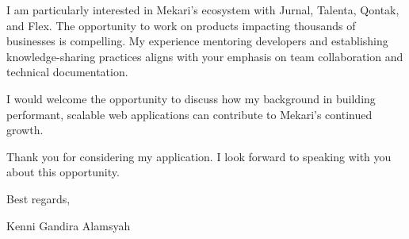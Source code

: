 \documentclass[11pt]{article}
\begin{document}
I am particularly interested in Mekari's ecosystem with Jurnal, Talenta, Qontak, and Flex. The opportunity to work on products impacting thousands of businesses is compelling. My experience mentoring developers and establishing knowledge-sharing practices aligns with your emphasis on team collaboration and technical documentation.

I would welcome the opportunity to discuss how my background in building performant, scalable web applications can contribute to Mekari's continued growth.

Thank you for considering my application. I look forward to speaking with you about this opportunity.

\vspace{1em}

Best regards,

\vspace{1em}

Kenni Gandira Alamsyah
\end{document}
